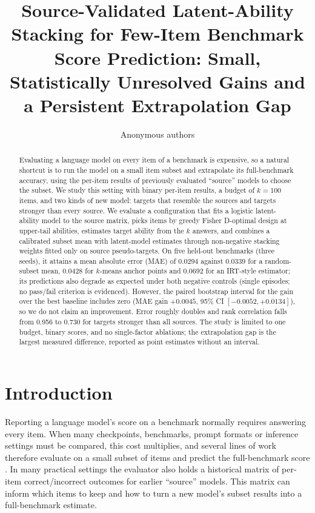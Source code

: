 \documentclass{article}
\title{Source-Validated Latent-Ability Stacking for Few-Item Benchmark Score Prediction: Small, Statistically Unresolved Gains and a Persistent Extrapolation Gap}
\author{Anonymous authors}
\begin{document}
\maketitle

\begin{abstract}
Evaluating a language model on every item of a benchmark is expensive, so a natural shortcut is to run the model on a small item subset and extrapolate its full-benchmark accuracy, using the per-item results of previously evaluated ``source'' models to choose the subset. We study this setting with binary per-item results, a budget of $k{=}100$ items, and two kinds of new model: targets that resemble the sources and targets stronger than every source. We evaluate a configuration that fits a logistic latent-ability model to the source matrix, picks items by greedy Fisher D-optimal design at upper-tail abilities, estimates target ability from the $k$ answers, and combines a calibrated subset mean with latent-model estimates through non-negative stacking weights fitted only on source pseudo-targets. On five held-out benchmarks (three seeds), it attains a mean absolute error (MAE) of 0.0294 against 0.0339 for a random-subset mean, 0.0428 for $k$-means anchor points and 0.0692 for an IRT-style estimator; its predictions also degrade as expected under both negative controls (single episodes; no pass/fail criterion is evidenced). However, the paired bootstrap interval for the gain over the best baseline includes zero (MAE gain $+0.0045$, 95\% CI $[-0.0052, +0.0134]$), so we do not claim an improvement. Error roughly doubles and rank correlation falls from 0.956 to 0.730 for targets stronger than all sources. The study is limited to one budget, binary scores, and no single-factor ablations; the extrapolation gap is the largest measured difference, reported as point estimates without an interval.
\end{abstract}

\section{Introduction}
Reporting a language model's score on a benchmark normally requires answering every item. When many checkpoints, benchmarks, prompt formats or inference settings must be compared, this cost multiplies, and several lines of work therefore evaluate on a small subset of items and predict the full-benchmark score \citep{Perlitz2023EfficientB,Vivek2023AnchorPB,Polo2024tinyBenchmarksEL,Kipnis2024metabenchA}. In many practical settings the evaluator also holds a historical matrix of per-item correct/incorrect outcomes for earlier ``source'' models. This matrix can inform which items to keep and how to turn a new model's subset results into a full-benchmark estimate.
\end{document}
